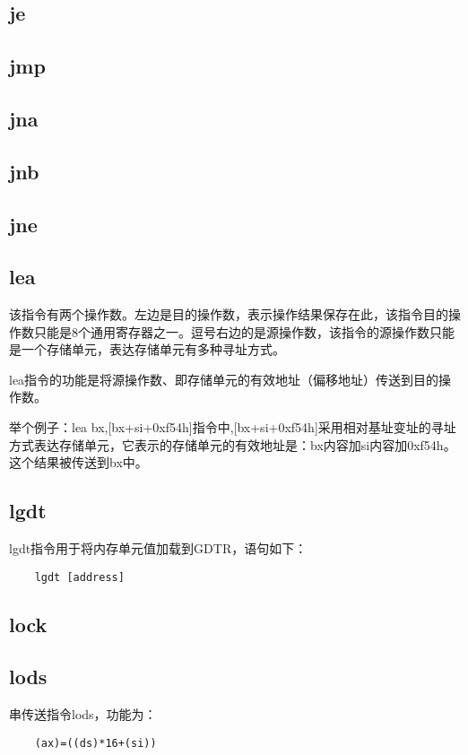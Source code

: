 \documentclass[a4paper,left=2.5cm,right=2.5cm,11pt]{article}
\begin{document}
\subsection{je}
\subsection{jmp}
\subsection{jna}
\subsection{jnb}
\subsection{jne}
\subsection{lea}
	该指令有两个操作数。左边是目的操作数，表示操作结果保存在此，该指令目的操作数只能是8个通用寄存器之一。逗号右边的是源操作数，该指令的源操作数只能是一个存储单元，表达存储单元有多种寻址方式。\par

	lea指令的功能是将源操作数、即存储单元的有效地址（偏移地址）传送到目的操作数。\par

	举个例子：lea bx,[bx+si+0xf54h]指令中,[bx+si+0xf54h]采用相对基址变址的寻址方式表达存储单元，它表示的存储单元的有效地址是：bx内容加si内容加0xf54h。这个结果被传送到bx中。

\subsection{lgdt}
	lgdt指令用于将内存单元值加载到GDTR，语句如下：
	\begin{lstlisting}
	lgdt [address]
	\end{lstlisting}

\subsection{lock}
\subsection{lods}
	串传送指令lods，功能为：
	\begin{lstlisting}
	(ax)=((ds)*16+(si))
	\end{lstlisting}
\end{document}
